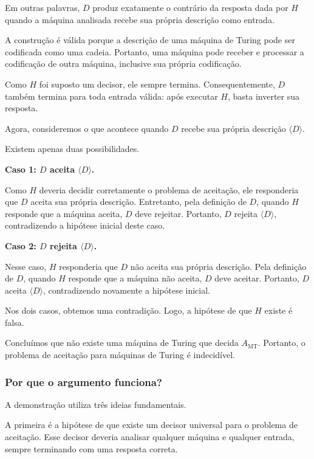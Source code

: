 \documentclass[
  brazilian,
  letterpaper,
]{book}
\theoremstyle{plain}
\theoremstyle{definition}
\theoremstyle{remark}
\begin{document}
Em outras palavras, \(D\) produz exatamente o contrário da resposta dada
por \(H\) quando a máquina analisada recebe sua própria descrição como
entrada.

A construção é válida porque a descrição de uma máquina de Turing pode
ser codificada como uma cadeia. Portanto, uma máquina pode receber e
processar a codificação de outra máquina, inclusive sua própria
codificação.

Como \(H\) foi suposto um decisor, ele sempre termina. Consequentemente,
\(D\) também termina para toda entrada válida: após executar \(H\),
basta inverter sua resposta.

Agora, consideremos o que acontece quando \(D\) recebe sua própria
descrição \(\langle D\rangle\).

Existem apenas duas possibilidades.

\textbf{Caso 1: \(D\) aceita \(\langle D\rangle\).}

Como \(H\) deveria decidir corretamente o problema de aceitação, ele
responderia que \(D\) aceita sua própria descrição. Entretanto, pela
definição de \(D\), quando \(H\) responde que a máquina aceita, \(D\)
deve rejeitar. Portanto, \(D\) rejeita \(\langle D\rangle\),
contradizendo a hipótese inicial deste caso.

\textbf{Caso 2: \(D\) rejeita \(\langle D\rangle\).}

Nesse caso, \(H\) responderia que \(D\) não aceita sua própria
descrição. Pela definição de \(D\), quando \(H\) responde que a máquina
não aceita, \(D\) deve aceitar. Portanto, \(D\) aceita
\(\langle D\rangle\), contradizendo novamente a hipótese inicial.

Nos dois casos, obtemos uma contradição. Logo, a hipótese de que \(H\)
existe é falsa.

Concluímos que não existe uma máquina de Turing que decida
\(A_{\mathrm{MT}}\). Portanto, o problema de aceitação para máquinas de
Turing é indecidível.

\subsubsection{Por que o argumento
funciona?}\label{por-que-o-argumento-funciona}

A demonstração utiliza três ideias fundamentais.

A primeira é a hipótese de que existe um decisor universal para o
problema de aceitação. Esse decisor deveria analisar qualquer máquina e
qualquer entrada, sempre terminando com uma resposta correta.
\end{document}
